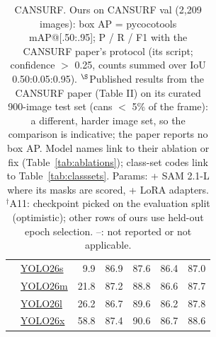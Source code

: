 \begin{table}[t]
{\begin{tabular}{l|lrcccc}
 & \hyperlink{abl:A11}{YOLO26s} & 9.9 & 86.9 & 87.6 & 86.4 & 87.0 \\
 & \hyperlink{abl:A11}{YOLO26m} & 21.8 & 87.2 & 88.8 & 86.6 & 87.7 \\
 & \hyperlink{abl:A11}{YOLO26l} & 26.2 & 86.7 & 89.6 & 86.2 & 87.8 \\
 & \hyperlink{abl:A11}{YOLO26x} & 58.8 & 87.4 & 90.6 & 86.7 & 88.6 \\
\bottomrule
\end{tabular}}
\caption{CANSURF. Ours on CANSURF val (2,209 images): box AP = pycocotools mAP@[.50:.95]; P / R / F1 with the CANSURF paper's protocol (its script; confidence $>$ 0.25, counts summed over IoU 0.50:0.05:0.95). $^\S$Published results from the CANSURF paper (Table II) on its curated 900-image test set (cans $<$ 5\% of the frame): a different, harder image set, so the comparison is indicative; the paper reports no box AP. Model names link to their ablation or fix (Table~\ref{tab:ablations}); class-set codes link to Table~\ref{tab:classsets}. Params: + SAM 2.1-L where its masks are scored, + LoRA adapters. $^\dagger$A11: checkpoint picked on the evaluation split (optimistic); other rows of ours use held-out epoch selection. --: not reported or not applicable.}
\label{tab:results_cansurf}
\end{table}

